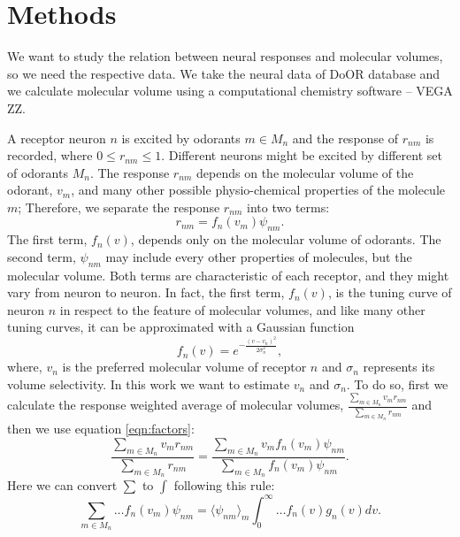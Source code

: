 \documentclass[11pt]{paper} %
\begin{document}
\section{Methods}
We want to study the relation between neural responses and molecular volumes, so we need the respective data. 
We take the neural data of DoOR database \cite{DoOR2010} and we calculate molecular volume using a computational chemistry software -- VEGA ZZ. 

A receptor neuron $n$ is excited by odorants $m \in M_n$ and the response of $r_{nm}$ is recorded, where $0 \le r_{nm} \le 1$. 
Different neurons might be excited by different set of odorants $M_n$. 
The response $r_{nm}$ depends on the molecular volume of the odorant, $v_m$, 
and many other possible physio-chemical properties of the molecule $m$; 
Therefore, we separate the response $r_{nm}$ into two terms:
\begin{equation}
	r_{nm} = f_n(v_m) \psi_{nm}.
	\label{eqn:factors}
\end{equation}
The first term, $f_n(v)$, depends only on the molecular volume of odorants.
The second term, $\psi_{nm}$ may include every other properties of molecules, but the molecular volume.
Both terms are characteristic of each receptor, and they might vary from neuron to neuron.
In fact, the first term, $f_n(v)$, is the tuning curve of neuron $n$ in respect to the feature of molecular volumes, 
and like many other tuning curves, it can be approximated with a Gaussian function
\begin{equation}
	\displaystyle f_n(v) = e^{-\frac{(v-v_n)^2}{2\sigma^2_n}}, 
\end{equation}
where, $v_n$ is the preferred molecular volume of receptor $n$ and $\sigma_n$ represents its volume selectivity. 
In this work we want to estimate $v_n$ and $\sigma_n$. 
To do so, first we calculate the response weighted average of molecular volumes, 
$\frac{\sum_{m\in M_n} v_m r_{nm}}{\sum_{m\in M_n} r_{nm}}$ and then we use equation \ref{eqn:factors}:
\begin{equation}
	\frac{\displaystyle \sum_{m\in M_n} v_m r_{nm}}{\displaystyle \sum_{m\in M_n} r_{nm}} = \frac{\displaystyle \sum_{m\in M_n} v_m f_n(v_m) \psi_{nm}}{\displaystyle \sum_{m\in M_n} f_n(v_m) \psi_{nm}}.
	\label{eqn:sta}
\end{equation}
Here we can convert $\sum$ to $\int$ following this rule:
\begin{equation}
	\sum_{m\in M_n} \dots f_n(v_m) \psi_{nm} =  \langle \psi_{nm} \rangle_m \int_0^\infty \dots f_n(v) g_n(v)  dv. 
	\label{eqn:sigma_to_int}
\end{equation}
\end{document}
